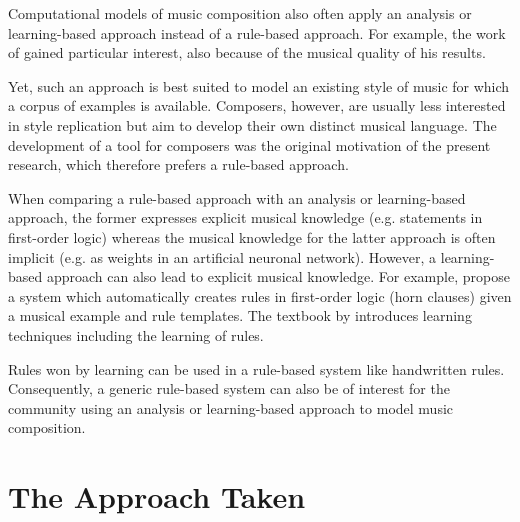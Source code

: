 \documentclass{scrartcl}
\begin{document}
Computational models of music composition also often apply an analysis or learning-based approach instead of a rule-based approach. For example, the work of \citet{Cope:1991,Cope:EMI:1996,Cope:AlgorithmicComposer:2000} gained particular interest, also because of the musical quality of his results. 

Yet, such an approach is best suited to model an existing style of music for which a corpus of examples is available. Composers, however, are usually less interested in style replication but aim to develop their own distinct musical language. 
The development of a tool for composers was the original motivation of the present research, which therefore prefers a rule-based approach. 

When comparing a rule-based approach with an analysis or learning-based approach, the former expresses explicit musical knowledge (e.g. statements in first-order logic) whereas the musical knowledge for the latter approach is often implicit (e.g. as weights in an artificial neuronal network). 
However, a learning-based approach can also lead to explicit musical knowledge. For example, \citep{Morales:Morales:LearningRules:1995} propose a system which automatically creates rules in first-order logic (horn clauses) given a musical example and rule templates. The textbook by \citet{Mitchell:MachineLearning:1997} introduces learning techniques including the learning of rules. 

Rules won by learning can be used in a rule-based system like handwritten rules. Consequently, a generic rule-based system can also be of interest for the community using an analysis or learning-based approach to model music composition. 


\section{The Approach Taken}
\label{sec:intro:approach-taken}


\end{document}
